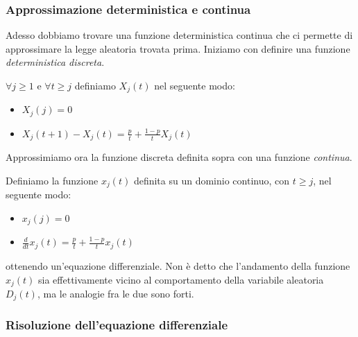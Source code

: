 \subsubsection{Approssimazione deterministica e continua}\label{sec:approssimazione}
\vspace{0.5cm}

Adesso dobbiamo trovare una funzione deterministica continua che ci permette di approssimare la legge aleatoria trovata prima. Iniziamo con definire una funzione \textit{deterministica discreta}.

\begin{definizione}
    $\forall j \geq 1 \text{ e } \forall t \geq j$ definiamo $X_j(t)$ nel seguente modo:
    \begin{itemize}
        \item $X_j(j) = 0$
        \item $X_j(t+1) - X_j(t) = \frac{p}{t} + \frac{1-p}{t}X_j(t)$
    \end{itemize}
\end{definizione}

 Approssimiamo ora la funzione discreta definita sopra con una funzione \textit{continua}.

\begin{definizione}
    Definiamo la funzione $x_j(t)$ definita su un dominio continuo, con $t \geq j$, nel seguente modo:
    \begin{itemize}
        \item $x_j(j) = 0$
        \item $\frac{d}{dt}x_j(t) = \frac{p}{t} + \frac{1-p}{t}x_j(t)$
    \end{itemize}
    ottenendo un'equazione differenziale. Non è detto che l'andamento della funzione $x_j(t)$ sia effettivamente vicino al comportamento della variabile aleatoria $D_j(t)$, ma le analogie fra le due sono forti.
\end{definizione}

\newpage

\subsubsection{Risoluzione dell'equazione differenziale}\label{sec:risoluzione}
\vspace{0.5cm}

